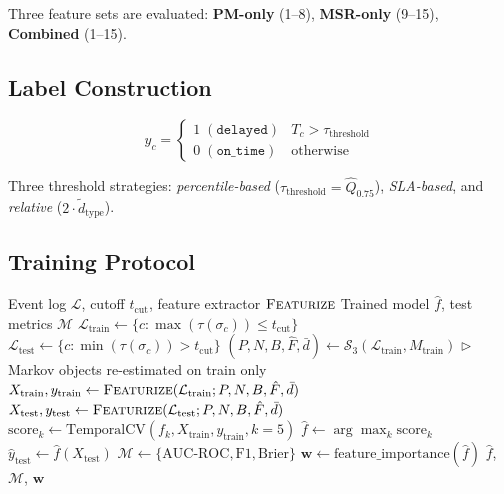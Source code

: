 Three feature sets are evaluated: \textbf{PM-only} (1--8),
\textbf{MSR-only} (9--15), \textbf{Combined} (1--15).


\subsection{Label Construction}
\label{sec:ml-labels}

\begin{definition}
\label{def:label}
\begin{equation}
\label{eq:label}
y_c = \begin{cases}
    1 \; (\texttt{delayed})  & T_c > \tau_{\text{threshold}} \\
    0 \; (\texttt{on\_time}) & \text{otherwise}
\end{cases}
\end{equation}
\end{definition}

Three threshold strategies: \emph{percentile-based}
($\tau_{\text{threshold}} = \hat{Q}_{0.75}$), \emph{SLA-based}, and
\emph{relative} ($2 \cdot \tilde{d}_{\text{type}}$).


\subsection{Training Protocol}
\label{sec:ml-training}

\begin{algorithm}[htbp]
\caption{ML Training with Temporal Hold-Out}
\label{alg:ml-training}
\begin{algorithmic}[1]
\REQUIRE Event log $\mathcal{L}$, cutoff $t_{\text{cut}}$,
    feature extractor $\textsc{Featurize}$
\ENSURE Trained model $\hat{f}$, test metrics $\mathcal{M}$
\STATE $\mathcal{L}_{\text{train}} \gets \{c : \max(\tau(\sigma_c)) \leq t_{\text{cut}}\}$
\STATE $\mathcal{L}_{\text{test}}  \gets \{c : \min(\tau(\sigma_c)) >    t_{\text{cut}}\}$
\STATE $(P, N, B, \hat{F}, \bar{d}) \gets \mathcal{S}_3(\mathcal{L}_{\text{train}}, M_{\text{train}})$ \hfill $\triangleright$ Markov objects re-estimated on train only
\STATE $X_{\text{train}}, y_{\text{train}} \gets \textsc{Featurize}(\mathcal{L}_{\text{train}}; P, N, B, \hat{F}, \bar{d})$
\STATE $X_{\text{test}},  y_{\text{test}}  \gets \textsc{Featurize}(\mathcal{L}_{\text{test}}; P, N, B, \hat{F}, \bar{d})$
    \STATE $\text{score}_k \gets \text{TemporalCV}(f_k, X_{\text{train}}, y_{\text{train}}, k=5)$
\ENDFOR
\STATE $\hat{f} \gets \arg\max_k \text{score}_k$
\STATE $\hat{y}_{\text{test}} \gets \hat{f}(X_{\text{test}})$
\STATE $\mathcal{M} \gets \{\text{AUC-ROC}, \text{F1}, \text{Brier}\}$
\STATE $\mathbf{w} \gets \text{feature\_importance}(\hat{f})$
\RETURN $\hat{f}$, $\mathcal{M}$, $\mathbf{w}$
\end{algorithmic}
\end{algorithm}

